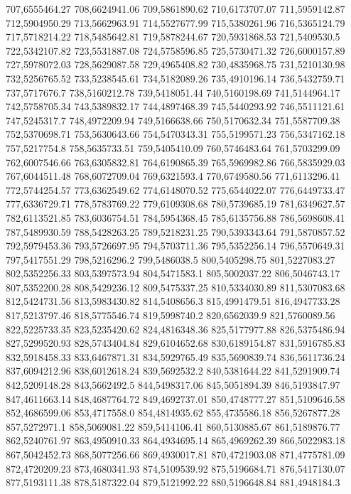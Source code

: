 707,6555464.27
708,6624941.06
709,5861890.62
710,6173707.07
711,5959142.87
712,5904950.29
713,5662963.91
714,5527677.99
715,5380261.96
716,5365124.79
717,5718214.22
718,5485642.81
719,5878244.67
720,5931868.53
721,5409530.5
722,5342107.82
723,5531887.08
724,5758596.85
725,5730471.32
726,6000157.89
727,5978072.03
728,5629087.58
729,4965408.82
730,4835968.75
731,5210130.98
732,5256765.52
733,5238545.61
734,5182089.26
735,4910196.14
736,5432759.71
737,5717676.7
738,5160212.78
739,5418051.44
740,5160198.69
741,5144964.17
742,5758705.34
743,5389832.17
744,4897468.39
745,5440293.92
746,5511121.61
747,5245317.7
748,4972209.94
749,5166638.66
750,5170632.34
751,5587709.38
752,5370698.71
753,5630643.66
754,5470343.31
755,5199571.23
756,5347162.18
757,5217754.8
758,5635733.51
759,5405410.09
760,5746483.64
761,5703299.09
762,6007546.66
763,6305832.81
764,6190865.39
765,5969982.86
766,5835929.03
767,6044511.48
768,6072709.04
769,6321593.4
770,6749580.56
771,6113296.41
772,5744254.57
773,6362549.62
774,6148070.52
775,6544022.07
776,6449733.47
777,6336729.71
778,5783769.22
779,6109308.68
780,5739685.19
781,6349627.57
782,6113521.85
783,6036754.51
784,5954368.45
785,6135756.88
786,5698608.41
787,5489930.59
788,5428263.25
789,5218231.25
790,5393343.64
791,5870857.52
792,5979453.36
793,5726697.95
794,5703711.36
795,5352256.14
796,5570649.31
797,5417551.29
798,5216296.2
799,5486038.5
800,5405298.75
801,5227083.27
802,5352256.33
803,5397573.94
804,5471583.1
805,5002037.22
806,5046743.17
807,5352200.28
808,5429236.12
809,5475337.25
810,5334030.89
811,5307083.68
812,5424731.56
813,5983430.82
814,5408656.3
815,4991479.51
816,4947733.28
817,5213797.46
818,5775546.74
819,5998740.2
820,6562039.9
821,5760089.56
822,5225733.35
823,5235420.62
824,4816348.36
825,5177977.88
826,5375486.94
827,5299520.93
828,5743404.84
829,6104652.68
830,6189154.87
831,5916785.83
832,5918458.33
833,6467871.31
834,5929765.49
835,5690839.74
836,5611736.24
837,6094212.96
838,6012618.24
839,5692532.2
840,5381644.22
841,5291909.74
842,5209148.28
843,5662492.5
844,5498317.06
845,5051894.39
846,5193847.97
847,4611663.14
848,4687764.72
849,4692737.01
850,4748777.27
851,5109646.58
852,4686599.06
853,4717558.0
854,4814935.62
855,4735586.18
856,5267877.28
857,5272971.1
858,5069081.22
859,5414106.41
860,5130885.67
861,5189876.77
862,5240761.97
863,4950910.33
864,4934695.14
865,4969262.39
866,5022983.18
867,5042452.73
868,5077256.66
869,4930017.81
870,4721903.08
871,4775781.09
872,4720209.23
873,4680341.93
874,5109539.92
875,5196684.71
876,5417130.07
877,5193111.38
878,5187322.04
879,5121992.22
880,5196648.84
881,4948184.3
